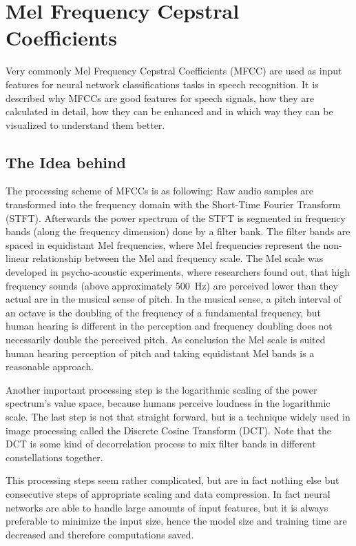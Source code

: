 
\section{Mel Frequency Cepstral Coefficients}\label{sec:signal_mfcc}
\thesisStateNotReady
Very commonly Mel Frequency Cepstral Coefficients (MFCC) are used as input features for neural network classifications tasks in speech recognition.
It is described why MFCCs are good features for speech signals, how they are calculated in detail, how they can be enhanced and in which way they can be visualized to understand them better.



\subsection{The Idea behind}
The processing scheme of MFCCs is as following:
Raw audio samples are transformed into the frequency domain with the Short-Time Fourier Transform (STFT).
Afterwards the power spectrum of the STFT is segmented in frequency bands (along the frequency dimension) done by a filter bank.
The filter bands are spaced in equidistant Mel frequencies, where Mel frequencies represent the non-linear relationship between the Mel and frequency scale.
The Mel scale was developed in psycho-acoustic experiments, where researchers found out, that high frequency sounds (above approximately \SI{500}{\hertz}) are perceived lower than they actual are in the musical sense of pitch.
In the musical sense, a pitch interval of an octave is the doubling of the frequency of a fundamental frequency, but human hearing is different in the perception and frequency doubling does not necessarily double the perceived pitch.
As conclusion the Mel scale is suited human hearing perception of pitch and taking equidistant Mel bands is a reasonable approach.

Another important processing step is the logarithmic scaling of the power spectrum's value space, because humans perceive loudness in the logarithmic scale.
The last step is not that straight forward, but is a technique widely used in image processing called the Discrete Cosine Transform (DCT).
Note that the DCT is some kind of decorrelation process to mix filter bands in different constellations together.

This processing steps seem rather complicated, but are in fact nothing else but consecutive steps of appropriate scaling and data compression.
In fact neural networks are able to handle large amounts of input features, but it is always preferable to minimize the input size, hence the model size and training time are decreased and therefore computations saved.


